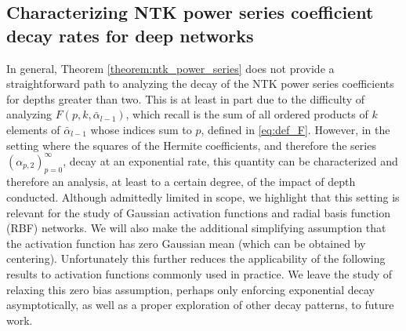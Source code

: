 


\subsection{Characterizing NTK power series coefficient decay rates for deep networks} \label{subsec:appendix:deep_decay}
In general, Theorem \ref{theorem:ntk_power_series} does not provide a straightforward path to analyzing the decay of the NTK power series coefficients for depths greater than two. This is at least in part due to the difficulty of analyzing $F(p,k,\bar{\alpha}_{l-1})$, which recall is the sum of all ordered products of $k$ elements of $\bar{\alpha}_{l-1}$ whose indices sum to $p$, defined in \eqref{eq:def_F}. However, in the setting where the squares of the Hermite coefficients, and therefore the series $(\alpha_{p,2})_{p=0}^{\infty}$, decay at an exponential rate, this quantity can be characterized and therefore an analysis, at least to a certain degree, of the impact of depth conducted. Although admittedly limited in scope, we highlight that this setting is relevant for the study of Gaussian activation functions and radial basis function (RBF) networks.  We will also make the additional simplifying assumption that the activation function has zero Gaussian mean (which can be obtained by centering).  Unfortunately this further reduces the applicability of the following results to activation functions commonly used in practice. We leave the study of relaxing this zero bias assumption, perhaps only enforcing exponential decay asymptotically, as well as a proper exploration of other decay patterns, to future work.

